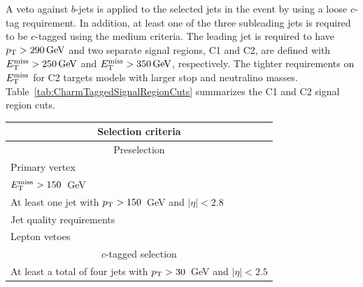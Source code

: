 A veto against $b$-jets is applied to the selected jets in the event by using a loose $c$-tag requirement.
In addition, at least one of the three subleading jets is required to be $c$-tagged using the medium criteria.
The leading jet is required to have $\pt>\unit[290]{GeV}$ and two separate signal regions, C1 and C2, are defined with $\met>\unit[250]{GeV}$ and $\met>\unit[350]{GeV}$, respectively.
The tighter requirements on $E_{\mathrm{T}}^{\mathrm{miss}}$ for C2 targets models with larger stop and neutralino masses.
Table~\ref{tab:CharmTaggedSignalRegionCuts} summarizes the C1 and C2 signal region cuts.

\begin{table}[!t]
  \renewcommand{\baselinestretch}{1}
  \begin{center}
    \begin{small}
      \begin{tabular*}{\textwidth}{@{\extracolsep{\fill}}lcc}\hline\hline
        \multicolumn{3}{c}{\small{\textbf{Selection criteria}}} \\\hline
        \multicolumn{3}{c}{{\small{Preselection}} } \\\hline
        \multicolumn{3}{l}{Primary vertex}\\
        \multicolumn{3}{l}{$E_{\mathrm{T}}^{\mathrm{miss}} > 150$~GeV }\\
        \multicolumn{3}{l}{At least one jet with $p_{\mathrm{T}} >150$~GeV and $|\eta|< 2.8$}\\
        \multicolumn{3}{l}{Jet quality requirements}   \\
        \multicolumn{3}{l}{Lepton vetoes}\\ \hline
        \multicolumn{3}{c}{\small{$c$-tagged selection}}\\\hline
        \multicolumn{3}{l}{At least a total of four jets with $p_{\mathrm{T}} > 30$~GeV and $|\eta|<2.5$}\\

\end{tabular*}
\end{small}
\end{center}
\end{table}
